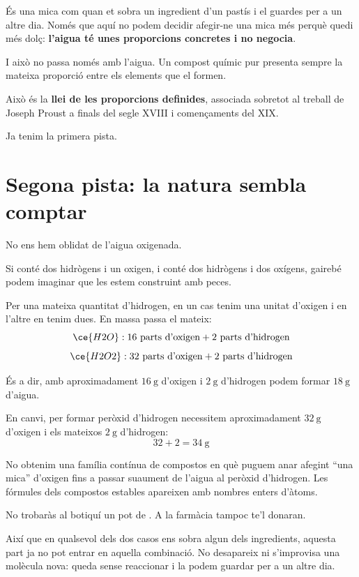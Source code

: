 És una mica com quan et sobra un ingredient d'un pastís i el guardes per a un altre dia. Només que aquí no podem decidir afegir-ne una mica més perquè quedi més dolç: \textbf{l'aigua té unes proporcions concretes i no negocia}.

I això no passa només amb l'aigua. Un compost químic pur presenta sempre la mateixa proporció entre els elements que el formen.

Això és la \textbf{llei de les proporcions definides}, associada sobretot al treball de Joseph Proust a finals del segle XVIII i començaments del XIX.

Ja tenim la primera pista.

\vfill
\newpage


\section{Segona pista: la natura sembla comptar}

No ens hem oblidat de l’aigua oxigenada. 

Si  conté dos hidrògens i un oxigen, i  conté dos hidrògens i dos oxígens, gairebé podem imaginar que les estem construint amb peces.

Per una mateixa quantitat d'hidrogen, en un cas tenim una unitat d'oxigen i en l'altre en tenim dues. 
En massa passa el mateix:
\[
\ce{H2O}: 16 \text{ parts d'oxigen} + 2  \text{ parts d'hidrogen}
\]
\[
\ce{H2O2}: 32 \text{ parts d'oxigen} + 2  \text{ parts d'hidrogen}
\]

És a dir, amb aproximadament $16\ \mathrm{g}$ d'oxigen i $2\ \mathrm{g}$ d'hidrogen podem formar $18\ \mathrm{g}$ d'aigua.

En canvi, per formar peròxid d'hidrogen necessitem aproximadament $32\ \mathrm{g}$ d'oxigen i els mateixos $2\ \mathrm{g}$ d'hidrogen:
\[
32+2=34\ \mathrm{g}
\]

No obtenim una família contínua de compostos en què puguem anar afegint ``una mica'' d'oxigen fins a passar suaument de l'aigua al peròxid d'hidrogen. Les fórmules dels compostos estables apareixen amb nombres enters d'àtoms.

No trobaràs al botiquí un pot de . A la farmàcia tampoc te'l donaran.

Així que en qualsevol dels dos casos ens sobra algun dels ingredients, aquesta part ja no pot entrar en aquella combinació. No desapareix ni s'improvisa una molècula nova: queda sense reaccionar i la podem guardar per a un altre dia.

